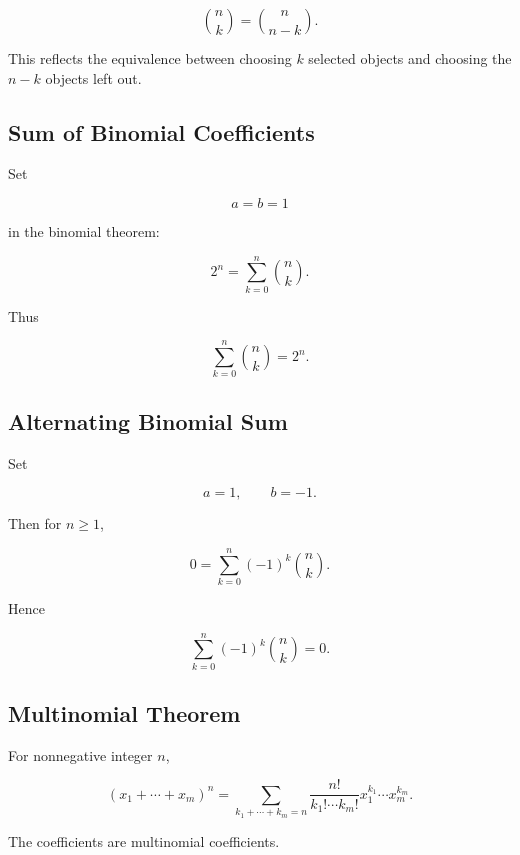 \[
\boxed{
\binom{n}{k}
=
\binom{n}{n-k}.
}
\]

This reflects the equivalence between choosing \(k\) selected objects and
choosing the \(n-k\) objects left out.

\subsection{Sum of Binomial Coefficients}
\label{subsec:sum-binomial-coefficients}

Set

\[
a=b=1
\]

in the binomial theorem:

\[
2^n
=
\sum_{k=0}^{n}
\binom{n}{k}.
\]

Thus

\[
\boxed{
\sum_{k=0}^{n}
\binom{n}{k}
=
2^n.
}
\]

\subsection{Alternating Binomial Sum}
\label{subsec:alternating-binomial-sum}

Set

\[
a=1,
\qquad
b=-1.
\]

Then for \(n\geq1\),

\[
0
=
\sum_{k=0}^{n}
(-1)^k
\binom{n}{k}.
\]

Hence

\[
\boxed{
\sum_{k=0}^{n}
(-1)^k
\binom{n}{k}
=
0.
}
\]

\subsection{Multinomial Theorem}
\label{subsec:multinomial-theorem-reference}

For nonnegative integer \(n\),

\[
\boxed{
(x_1+\cdots+x_m)^n
=
\sum_{
k_1+\cdots+k_m=n
}
\frac{n!}{
k_1!\cdots k_m!
}
x_1^{k_1}
\cdots
x_m^{k_m}.
}
\]

The coefficients are multinomial coefficients.

